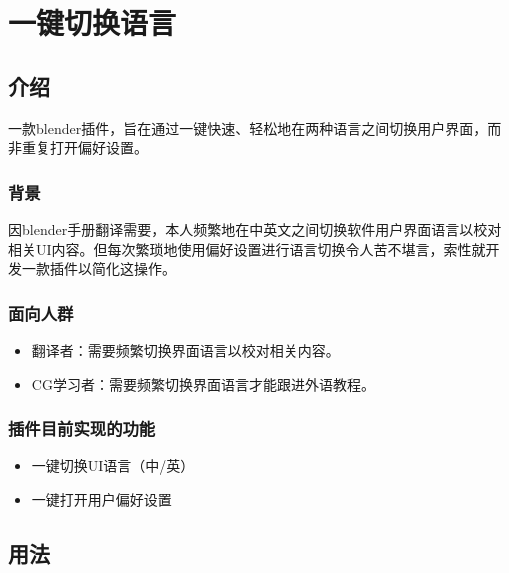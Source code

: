 \documentclass{resources/DocClass}
\begin{document}
    \maketitle
    \frontmatter
    
    
    {\centering \tableofcontents} %
    \mainmatter

    \chapter{一键切换语言}
    \section{介绍}
    一款blender插件，旨在通过一键快速、轻松地在两种语言之间切换用户界面，而非重复打开偏好设置。

    \subsection{背景}
    因blender手册翻译需要，本人频繁地在中英文之间切换软件用户界面语言以校对相关UI内容。但每次繁琐地使用偏好设置进行语言切换令人苦不堪言，索性就开发一款插件以简化这操作。

    \subsection{面向人群}
    \begin{itemize}
        \item 翻译者：需要频繁切换界面语言以校对相关内容。
        \item CG学习者：需要频繁切换界面语言才能跟进外语教程。
    \end{itemize}

    \subsection{插件目前实现的功能}
    \begin{itemize}
        \item 一键切换UI语言（中/英）
        \item 一键打开用户偏好设置
    \end{itemize}

    \section{用法}
\end{document}

